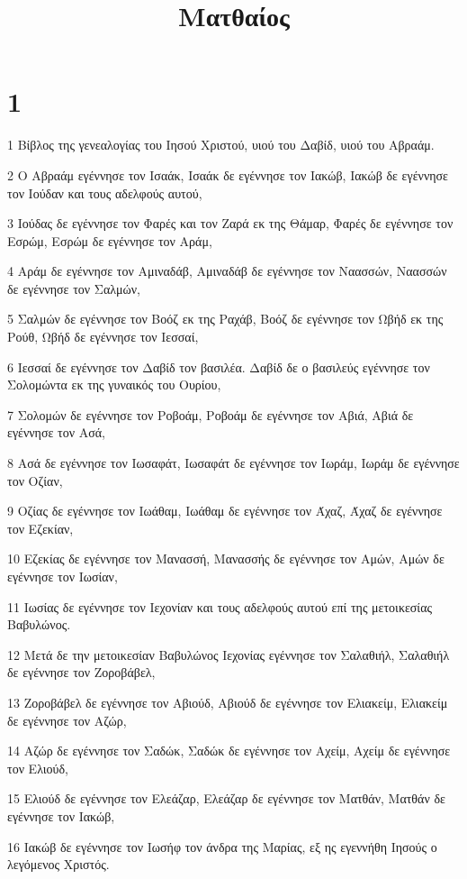 

\title{Ματθαίος}


\chapter{1}

\par 1 Βίβλος της γενεαλογίας του Ιησού Χριστού, υιού του Δαβίδ, υιού του Αβραάμ.
\par 2 Ο Αβραάμ εγέννησε τον Ισαάκ, Ισαάκ δε εγέννησε τον Ιακώβ, Ιακώβ δε εγέννησε τον Ιούδαν και τους αδελφούς αυτού,
\par 3 Ιούδας δε εγέννησε τον Φαρές και τον Ζαρά εκ της Θάμαρ, Φαρές δε εγέννησε τον Εσρώμ, Εσρώμ δε εγέννησε τον Αράμ,
\par 4 Αράμ δε εγέννησε τον Αμιναδάβ, Αμιναδάβ δε εγέννησε τον Ναασσών, Ναασσών δε εγέννησε τον Σαλμών,
\par 5 Σαλμών δε εγέννησε τον Βοόζ εκ της Ραχάβ, Βοόζ δε εγέννησε τον Ωβήδ εκ της Ρούθ, Ωβήδ δε εγέννησε τον Ιεσσαί,
\par 6 Ιεσσαί δε εγέννησε τον Δαβίδ τον βασιλέα. Δαβίδ δε ο βασιλεύς εγέννησε τον Σολομώντα εκ της γυναικός του Ουρίου,
\par 7 Σολομών δε εγέννησε τον Ροβοάμ, Ροβοάμ δε εγέννησε τον Αβιά, Αβιά δε εγέννησε τον Ασά,
\par 8 Ασά δε εγέννησε τον Ιωσαφάτ, Ιωσαφάτ δε εγέννησε τον Ιωράμ, Ιωράμ δε εγέννησε τον Οζίαν,
\par 9 Οζίας δε εγέννησε τον Ιωάθαμ, Ιωάθαμ δε εγέννησε τον Άχαζ, Άχαζ δε εγέννησε τον Εζεκίαν,
\par 10 Εζεκίας δε εγέννησε τον Μανασσή, Μανασσής δε εγέννησε τον Αμών, Αμών δε εγέννησε τον Ιωσίαν,
\par 11 Ιωσίας δε εγέννησε τον Ιεχονίαν και τους αδελφούς αυτού επί της μετοικεσίας Βαβυλώνος.
\par 12 Μετά δε την μετοικεσίαν Βαβυλώνος Ιεχονίας εγέννησε τον Σαλαθιήλ, Σαλαθιήλ δε εγέννησε τον Ζοροβάβελ,
\par 13 Ζοροβάβελ δε εγέννησε τον Αβιούδ, Αβιούδ δε εγέννησε τον Ελιακείμ, Ελιακείμ δε εγέννησε τον Αζώρ,
\par 14 Αζώρ δε εγέννησε τον Σαδώκ, Σαδώκ δε εγέννησε τον Αχείμ, Αχείμ δε εγέννησε τον Ελιούδ,
\par 15 Ελιούδ δε εγέννησε τον Ελεάζαρ, Ελεάζαρ δε εγέννησε τον Ματθάν, Ματθάν δε εγέννησε τον Ιακώβ,
\par 16 Ιακώβ δε εγέννησε τον Ιωσήφ τον άνδρα της Μαρίας, εξ ης εγεννήθη Ιησούς ο λεγόμενος Χριστός.
